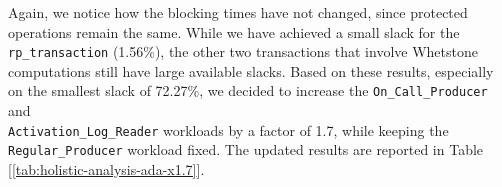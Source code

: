 \begin{table}[H]
  \caption{Holistic Analysis Results Ada x88}
  \label{tab:holistic-analysis-ada-x88}
\end{table}

Again, we notice how the blocking times have not changed, since protected
operations remain the same. While we have achieved a small slack for the
\texttt{rp\_transaction} (1.56\%), the other two transactions that involve
Whetstone computations still have large available slacks. Based on these
results, especially on the smallest slack of 72.27\%, we decided to increase the
\texttt{On\_Call\_Producer} and \\
\texttt{Activation\_Log\_Reader} workloads by a factor of 1.7, while keeping the
\texttt{Regular\_Producer} workload fixed. The updated results are reported in Table
[\ref{tab:holistic-analysis-ada-x1.7}].  

\begin{table}[H]
  \caption{Holistic Analysis Results Ada x1.7}
  \label{tab:holistic-analysis-ada-x1.7}
\end{table}

